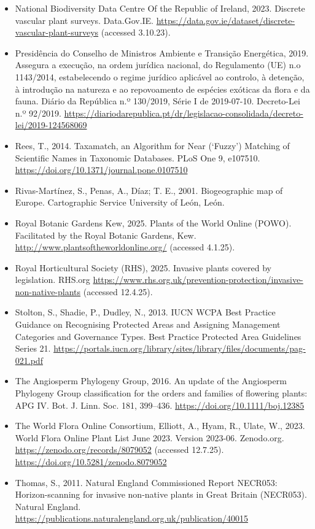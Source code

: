 \documentclass[
]{article}
\begin{document}
\begin{itemize}
  Ministerio para la Transición Ecológica y el Reto Demográfico, 2023b.
  Catálogo Español de Especies Exóticas Invasoras. MITECO. URL
  \url{https://www.miteco.gob.es/es/biodiversidad/temas/conservacion-de-especies/especies-exoticas-invasoras/ce-eei-catalogo.aspx}
  (accessed 6.11.23).
\item
  National Biodiversity Data Centre Of the Republic of Ireland, 2023.
  Discrete vascular plant surveys. Data.Gov.IE.
  \url{https://data.gov.ie/dataset/discrete-vascular-plant-surveys}
  (accessed 3.10.23).
\item
  Presidência do Conselho de Ministros Ambiente e Transição Energética,
  2019. Assegura a execução, na ordem jurídica nacional, do Regulamento
  (UE) n.o 1143/2014, estabelecendo o regime jurídico aplicável ao
  controlo, à detenção, à introdução na natureza e ao repovoamento de
  espécies exóticas da flora e da fauna. Diário da República n.º
  130/2019, Série I de 2019-07-10. Decreto-Lei n.º 92/2019.
  \url{https://diariodarepublica.pt/dr/legislacao-consolidada/decreto-lei/2019-124568069}
\item
  Rees, T., 2014. Taxamatch, an Algorithm for Near (`Fuzzy') Matching of
  Scientific Names in Taxonomic Databases. PLoS One 9, e107510.
  \url{https://doi.org/10.1371/journal.pone.0107510}
\item
  Rivas-Martínez, S., Penas, A., Díaz; T. E., 2001. Biogeographic map of
  Europe. Cartographic Service University of León, León.
\item
  Royal Botanic Gardens Kew, 2025. Plants of the World Online (POWO).
  Facilitated by the Royal Botanic Gardens, Kew.
  \url{http://www.plantsoftheworldonline.org/} (accessed 4.1.25).
\item
  Royal Horticultural Society (RHS), 2025. Invasive plants covered by
  legislation. RHS.org
  \url{https://www.rhs.org.uk/prevention-protection/invasive-non-native-plants}
  (accessed 12.4.25).
\item
  Stolton, S., Shadie, P., Dudley, N., 2013. IUCN WCPA Best Practice
  Guidance on Recognising Protected Areas and Assigning Management
  Categories and Governance Types. Best Practice Protected Area
  Guidelines Series 21.
  \url{https://portals.iucn.org/library/sites/library/files/documents/pag-021.pdf}
\item
  The Angiosperm Phylogeny Group, 2016. An update of the Angiosperm
  Phylogeny Group classification for the orders and families of
  flowering plants: APG IV. Bot. J. Linn. Soc. 181, 399--436.
  \url{https://doi.org/10.1111/boj.12385}
\item
  The World Flora Online Consortium, Elliott, A., Hyam, R., Ulate, W.,
  2023. World Flora Online Plant List June 2023. Version 2023-06.
  Zenodo.org. \url{https://zenodo.org/records/8079052} (accessed
  12.7.25). \url{https://doi.org/10.5281/zenodo.8079052}
\item
  Thomas, S., 2011. Natural England Commissioned Report NECR053:
  Horizon-scanning for invasive non-native plants in Great Britain
  (NECR053). Natural England.
  \url{https://publications.naturalengland.org.uk/publication/40015}
\end{itemize}
\end{document}
